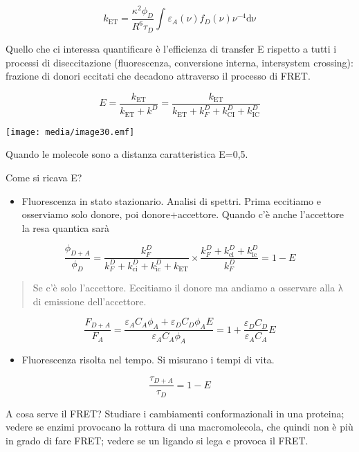 \[k_{\text{ET}} = \frac{\kappa^{2}\phi_{D}}{R^{6}\tau_{D}}\int_{}^{}{\varepsilon_{A}\left( \nu \right)f_{D}\left( \nu \right)\nu^{- 4}\text{dν}}\]

Quello che ci interessa quantificare è l'efficienza di transfer E
rispetto a tutti i processi di diseccitazione (fluorescenza, conversione
interna, intersystem crossing): frazione di donori eccitati che decadono
attraverso il processo di FRET.

\[E = \frac{k_{\text{ET}}}{k_{\text{ET}} + k^{D}} = \frac{k_{\text{ET}}}{k_{\text{ET}} + k_{F}^{D} + k_{\text{CI}}^{D} + k_{\text{IC}}^{D}}\]

\texttt{[image: media/image30.emf]}

Quando le molecole sono a distanza caratteristica E=0,5.

Come si ricava E?

\begin{itemize}
\item
  Fluorescenza in stato stazionario. Analisi di spettri. Prima eccitiamo
  e osserviamo solo donore, poi donore+accettore. Quando c'è anche
  l'accettore la resa quantica sarà
\end{itemize}

\[\frac{\phi_{D + A}}{\phi_{D}} = \frac{k_{F}^{D}}{k_{F}^{D} + k_{\text{ci}}^{D} + k_{\text{ic}}^{D} + k_{\text{ET}}} \times \frac{k_{F}^{D} + k_{\text{ci}}^{D} + k_{\text{ic}}^{D}}{k_{F}^{D}} = 1 - E\]

\begin{quote}
Se c'è solo l'accettore. Eccitiamo il donore ma andiamo a osservare alla
λ di emissione dell'accettore.
\end{quote}

\[\frac{F_{D + A}}{F_{A}} = \frac{\varepsilon_{A}C_{A}\phi_{A} + \varepsilon_{D}C_{D}\phi_{A}E}{\varepsilon_{A}C_{A}\phi_{A}} = 1 + \frac{\varepsilon_{D}C_{D}}{\varepsilon_{A}C_{A}}E\]

\begin{itemize}
\item
  Fluorescenza risolta nel tempo. Si misurano i tempi di vita.
\end{itemize}

\[\frac{\tau_{D + A}}{\tau_{D}} = 1 - E\]

A cosa serve il FRET? Studiare i cambiamenti conformazionali in una
proteina; vedere se enzimi provocano la rottura di una macromolecola,
che quindi non è più in grado di fare FRET; vedere se un ligando si lega
e provoca il FRET.

